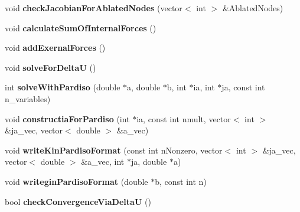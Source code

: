 \begin{DoxyCompactItemize}
\item 
\hypertarget{classNewtonRaphsonSolver_ae78feecb9e6461ce644a7b5b063d0739}{}void {\bfseries check\+Jacobian\+For\+Ablated\+Nodes} (vector$<$ int $>$ \&Ablated\+Nodes)\label{classNewtonRaphsonSolver_ae78feecb9e6461ce644a7b5b063d0739}

\item 
\hypertarget{classNewtonRaphsonSolver_aba9098983f90b6237a9d32ea633bcb7f}{}void {\bfseries calculate\+Sum\+Of\+Internal\+Forces} ()\label{classNewtonRaphsonSolver_aba9098983f90b6237a9d32ea633bcb7f}

\item 
\hypertarget{classNewtonRaphsonSolver_a24f8fb47b9c29dd9856228ba0602f69e}{}void {\bfseries add\+Exernal\+Forces} ()\label{classNewtonRaphsonSolver_a24f8fb47b9c29dd9856228ba0602f69e}

\item 
\hypertarget{classNewtonRaphsonSolver_a8efb09b253b7d19bd978296314d65c24}{}void {\bfseries solve\+For\+Delta\+U} ()\label{classNewtonRaphsonSolver_a8efb09b253b7d19bd978296314d65c24}

\item 
\hypertarget{classNewtonRaphsonSolver_a710aa89593ea0236da8bf6e4594dbe3d}{}int {\bfseries solve\+With\+Pardiso} (double $\ast$a, double $\ast$b, int $\ast$ia, int $\ast$ja, const int n\+\_\+variables)\label{classNewtonRaphsonSolver_a710aa89593ea0236da8bf6e4594dbe3d}

\item 
\hypertarget{classNewtonRaphsonSolver_a35b0bc520d4a1662e98df5cf8e4df60b}{}void {\bfseries constructia\+For\+Pardiso} (int $\ast$ia, const int nmult, vector$<$ int $>$ \&ja\+\_\+vec, vector$<$ double $>$ \&a\+\_\+vec)\label{classNewtonRaphsonSolver_a35b0bc520d4a1662e98df5cf8e4df60b}

\item 
\hypertarget{classNewtonRaphsonSolver_a17a608992fe423b85fe4f461381339fb}{}void {\bfseries write\+Kin\+Pardiso\+Format} (const int n\+Nonzero, vector$<$ int $>$ \&ja\+\_\+vec, vector$<$ double $>$ \&a\+\_\+vec, int $\ast$ja, double $\ast$a)\label{classNewtonRaphsonSolver_a17a608992fe423b85fe4f461381339fb}

\item 
\hypertarget{classNewtonRaphsonSolver_a78957a2905c38a9170a5c27d6f49326d}{}void {\bfseries writegin\+Pardiso\+Format} (double $\ast$b, const int n)\label{classNewtonRaphsonSolver_a78957a2905c38a9170a5c27d6f49326d}

\item 
\hypertarget{classNewtonRaphsonSolver_a3653a563e32649e0c90407aa089a995b}{}bool {\bfseries check\+Convergence\+Via\+Delta\+U} ()\label{classNewtonRaphsonSolver_a3653a563e32649e0c90407aa089a995b}


\end{DoxyCompactItemize}
